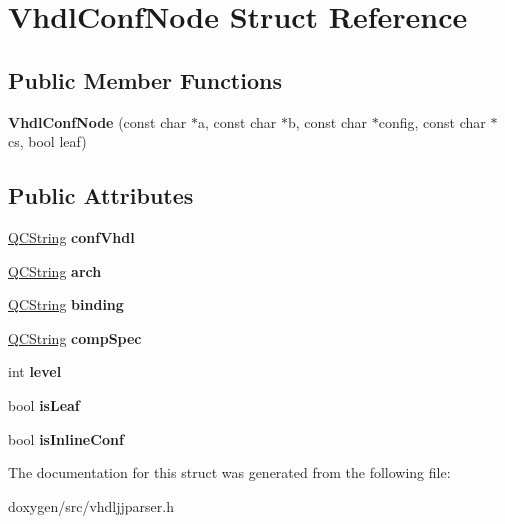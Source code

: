 \hypertarget{struct_vhdl_conf_node}{}\section{Vhdl\+Conf\+Node Struct Reference}
\label{struct_vhdl_conf_node}
\subsection*{Public Member Functions}
\begin{DoxyCompactItemize}
\item 
\mbox{\label{struct_vhdl_conf_node_a4d2fd7ffc7cc92605131ad36a1cc89d9}} 
{\bfseries Vhdl\+Conf\+Node} (const char $\ast$a, const char $\ast$b, const char $\ast$config, const char $\ast$cs, bool leaf)
\end{DoxyCompactItemize}
\subsection*{Public Attributes}
\begin{DoxyCompactItemize}
\item 
\mbox{\label{struct_vhdl_conf_node_aae66e539683b80ab09430a03f6b24aae}} 
\mbox{\hyperlink{class_q_c_string}{Q\+C\+String}} {\bfseries conf\+Vhdl}
\item 
\mbox{\label{struct_vhdl_conf_node_a5dfd0b52022b21363f60709dfce7623d}} 
\mbox{\hyperlink{class_q_c_string}{Q\+C\+String}} {\bfseries arch}
\item 
\mbox{\label{struct_vhdl_conf_node_a0a77b95ba7755c964cee04586ea18523}} 
\mbox{\hyperlink{class_q_c_string}{Q\+C\+String}} {\bfseries binding}
\item 
\mbox{\label{struct_vhdl_conf_node_acec3e9f2d52721d4a229c1cbf1f5c61b}} 
\mbox{\hyperlink{class_q_c_string}{Q\+C\+String}} {\bfseries comp\+Spec}
\item 
\mbox{\label{struct_vhdl_conf_node_a3d98980a9818f52a3753602281d19b8e}} 
int {\bfseries level}
\item 
\mbox{\label{struct_vhdl_conf_node_a963695dba442c5aa442570969a61a3bc}} 
bool {\bfseries is\+Leaf}
\item 
\mbox{\label{struct_vhdl_conf_node_ac5465303d990494eb98a12d4666ab368}} 
bool {\bfseries is\+Inline\+Conf}
\end{DoxyCompactItemize}


The documentation for this struct was generated from the following file\+:\begin{DoxyCompactItemize}
\item 
doxygen/src/vhdljjparser.\+h\end{DoxyCompactItemize}
